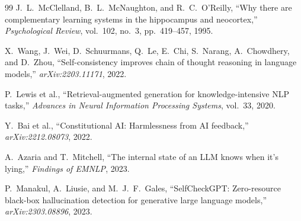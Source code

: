 \documentclass[11pt,letterpaper]{article}
\begin{document}
\begin{thebibliography}{99}
J.~L.~McClelland, B.~L.~McNaughton, and R.~C.~O'Reilly, ``Why there are complementary learning systems in the hippocampus and neocortex,'' \textit{Psychological Review}, vol.~102, no.~3, pp.~419--457, 1995.

X.~Wang, J.~Wei, D.~Schuurmans, Q.~Le, E.~Chi, S.~Narang, A.~Chowdhery, and D.~Zhou, ``Self-consistency improves chain of thought reasoning in language models,'' \textit{arXiv:2203.11171}, 2022.

P.~Lewis et al., ``Retrieval-augmented generation for knowledge-intensive NLP tasks,'' \textit{Advances in Neural Information Processing Systems}, vol.~33, 2020.

Y.~Bai et al., ``Constitutional AI: Harmlessness from AI feedback,'' \textit{arXiv:2212.08073}, 2022.

A.~Azaria and T.~Mitchell, ``The internal state of an LLM knows when it's lying,'' \textit{Findings of EMNLP}, 2023.

P.~Manakul, A.~Liusie, and M.~J.~F.~Gales, ``SelfCheckGPT: Zero-resource black-box hallucination detection for generative large language models,'' \textit{arXiv:2303.08896}, 2023.
\end{thebibliography}
\end{document}
